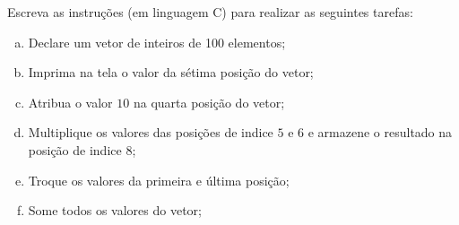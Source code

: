 
Escreva as instruções (em linguagem C) para realizar as seguintes tarefas:

\begin{enumerate}[a)]
    \item Declare um vetor de inteiros de 100 elementos;
    \item Imprima na tela o valor da sétima posição do vetor;
    \item Atribua o valor $10$ na quarta posição do vetor;
    \item Multiplique os valores das posições de indice $5$ e $6$ e armazene o resultado na posição de indice $8$;
    \item Troque os valores da primeira e última posição;
    \item Some todos os valores do vetor;
\end{enumerate}
